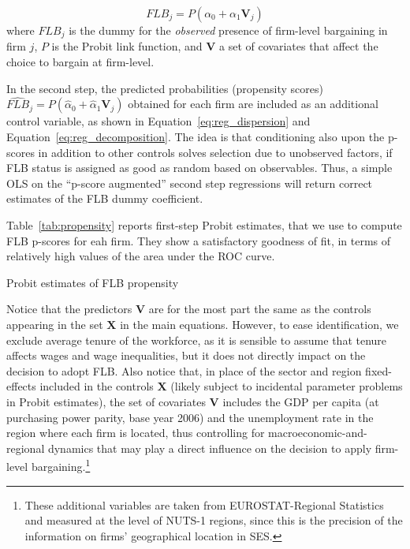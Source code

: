 \documentclass[12pt]{article}
\begin{document}
\begin{equation}
\label{eq:reg_propensity}
  \mathit{FLB}_j = \mathit{P}\left( \alpha_0 + \alpha_1\bm{V}_j \right)
\end{equation}
where $\mathit{FLB}_j$ is the dummy for the \emph{observed} presence of firm-level bargaining in firm $j$, $\mathit{P}$ is the Probit link function, and $\bm{V}$ a set of covariates that affect the choice to bargain at firm-level.

In the second step, the predicted probabilities (propensity scores)
$\widehat{\mathit{FLB}}_j = \mathit{P}\left( \hat{\alpha}_0 +
  \hat{\alpha}_1\bm{V}_j \right)$ obtained for each firm are included
as an additional control variable, as shown in Equation~\ref{eq:reg_dispersion} and Equation~\ref{eq:reg_decomposition}. The idea is that conditioning also upon the p-scores in addition to other controls solves selection due to unobserved factors, if FLB status is assigned as good as random based on observables. Thus, a simple OLS on the “p-score augmented” second step regressions will return correct estimates of the FLB dummy coefficient.

Table~\ref{tab:propensity} reports first-step Probit estimates, that
we use to compute FLB p-scores for eah firm. They show a satisfactory
goodness of fit, in terms of relatively high values of the area under
the ROC curve.

\begin{table}[thb]
\caption{Probit estimates of FLB propensity}
\label{tab:propensity}

\end{table}

Notice that the predictors $\bm{V}$ are for the most part the same as
the controls appearing in the set $\bm{X}$ in the main equations.
However, to ease identification, we exclude average tenure of the
workforce, as it is sensible to assume that tenure affects wages and
wage inequalities, but it does not directly impact on the decision to
adopt FLB. Also notice that, in place of the sector and region
fixed-effects included in the controls $\bm{X}$ (likely subject to
incidental parameter problems in Probit estimates), the set of
covariates $\bm{V}$ includes the GDP per capita (at
purchasing power parity, base year 2006) and the unemployment rate in
the region where each firm is located, thus controlling for
macroeconomic-and-regional dynamics that may play a direct influence
on the decision to apply firm-level bargaining.\footnote{These
  additional variables are taken from EUROSTAT-Regional Statistics and
  measured at the level of NUTS-1 regions, since this is the
  precision of the information on firms' geographical location in
  SES.}
\end{document}
